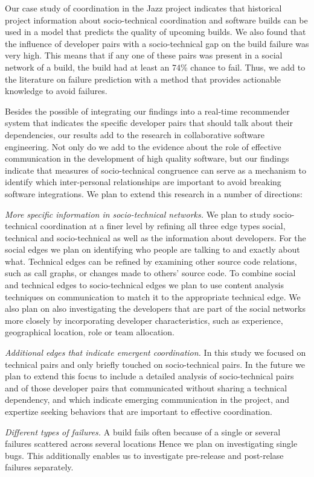 Our case study of coordination in the Jazz project indicates that 
historical project information about socio-technical coordination and software
builds can be used in a model that predicts the quality of upcoming builds. We also found
that the influence of developer pairs with a socio-technical gap on the build
failure was very high. This means that if any one of these pairs was present in a
social network of a build, the build had at least an 74\% chance to fail.
Thus, we add to the literature on failure prediction with a method that
provides actionable knowledge to avoid failures. 

Besides the possible of integrating our findings into a real-time recommender system that indicates the specific developer pairs that should talk about their dependencies, our results add to the research in
collaborative software engineering. Not only do we add to the evidence about
the role of effective communication in the development of high quality
software, but our findings indicate that measures of socio-technical congruence can
serve as a mechanism to identify which inter-personal relationships are
important to avoid breaking software integrations. 
%
We plan to extend this research in a number of directions:

\emph{More specific information in socio-technical networks.}
We plan to study socio-technical coordination at a finer level by refining all
three edge types social, technical and socio-technical as well as the
information about developers. For the social edges we plan on identifying who
people are talking to and exactly about what. Technical edges can be refined by examining other source code relations, such as call
graphs, or changes made to others' source code. 
%
To combine social and technical
edges to socio-technical edges we plan to use content analysis techniques on
communication to match it to the appropriate technical edge. We also plan
on also investigating the developers that are part of the social networks more
closely by incorporating developer characteristics, such as experience,
geographical location, role or team allocation.

\emph{Additional edges that indicate emergent coordination.}
In this study we focused on technical pairs and only briefly touched on
socio-technical pairs. In the future we plan to extend this focus to include a
detailed analysis of socio-technical pairs and of those
developer pairs that communicated without sharing a technical dependency, and
which indicate emerging communication in the project, and expertize seeking
behaviors that are important to effective coordination.

\emph{Different types of failures.}
A build fails often because of a single or several failures scattered across several locations
Hence we plan on
investigating single bugs. This additionally enables us to investigate pre-release and post-relase failures separately.